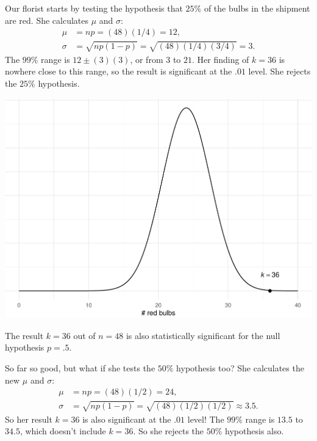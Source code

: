 \documentclass[justified]{tufte-book}
\theoremstyle{definition}
\theoremstyle{definition}
\theoremstyle{definition}
\theoremstyle{remark}
\begin{document}
Our florist starts by testing the hypothesis that \(25\%\) of the bulbs in the shipment are red. She calculates \(\mu\) and \(\sigma\):
\[
  \begin{aligned}
    \mu &= np = (48)(1/4) = 12,\\
    \sigma &= \sqrt{np(1-p)} = \sqrt{(48)(1/4)(3/4)} = 3.
  \end{aligned}
\]
The \(99\%\) range is \(12 \pm (3)(3)\), or from \(3\) to \(21\). Her finding of \(k = 36\) is nowhere close to this range, so the result is significant at the \(.01\) level. She rejects the \(25\%\) hypothesis.

\begin{marginfigure}
\includegraphics{_main_files/figure-latex/unnamed-chunk-156-1} \caption[The result $k = 36$ out of $n = 48$ is also statistically significant for the null hypothesis $p = .5$]{The result $k = 36$ out of $n = 48$ is also statistically significant for the null hypothesis $p = .5$.}\label{fig:unnamed-chunk-156}
\end{marginfigure}

So far so good, but what if she tests the \(50\%\) hypothesis too? She calculates the new \(\mu\) and \(\sigma\):
\[
  \begin{aligned}
    \mu &= np = (48)(1/2) = 24,\\
    \sigma &= \sqrt{np(1-p)} = \sqrt{(48)(1/2)(1/2)} \approx 3.5.
  \end{aligned}
\]
So her result \(k = 36\) is also significant at the \(.01\) level! The \(99\%\) range is \(13.5\) to \(34.5\), which doesn't include \(k = 36\). So she rejects the \(50\%\) hypothesis also.
\end{document}
